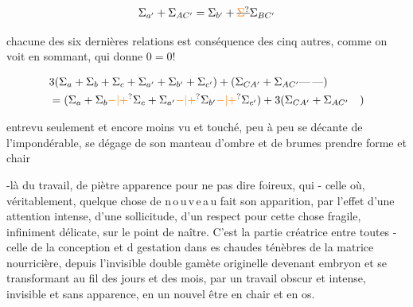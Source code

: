 \[
 \Sigma_{a'}+\Sigma_{AC'}=\Sigma_{b'}+\deleted{\unsure{\Sigma}}\Sigma_{BC'}
\]

chacune des six dernières relations est conséquence des cinq autres, comme on voit en sommant, qui donne $0=0$!

\[
 \begin{aligned}
 &3(\Sigma_a+\Sigma_b+\Sigma_c+\Sigma_{a'}+\Sigma_{b'}+\Sigma_{c'})
 +(\Sigma_{CA'}+\Sigma_{AC'}\mathord{\text{---}}\,\mathord{\text{---}})\\
 &=(\Sigma_a+\Sigma_b\unsure{-|+}\Sigma_c+\Sigma_{a'}\unsure{-|+}\Sigma_{b'}\unsure{-|+}\Sigma_{c'})
 +3(\Sigma_{CA'}+\Sigma_{AC'}\quad)
 \end{aligned}
\]

entrevu seulement et encore moins vu et touché,  peu à peu se   décante de l'impondérable, se dégage de son manteau d'ombre et de brumes   prendre forme et chair  

   -là du travail, de piètre apparence pour ne pas dire  foireux, qui     - celle où, véritablement, quelque chose de \mbox{n\,o\,u\,v\,e\,a\,u} fait son apparition, par l'effet d'une attention intense, d'une sollicitude, d'un respect pour cette chose fragile, infiniment délicate, sur le point de naître. C'est la partie créatrice entre toutes - celle de la conception et d  gestation  dans es chaudes ténèbres de la matrice nourricière,  depuis l'invisible double gamète  originelle\handwritten{,} devenant  embryon et se transformant au fil des jours et des mois, par un travail obscur et intense, invisible et sans apparence, en un nouvel être en chair et en os.

